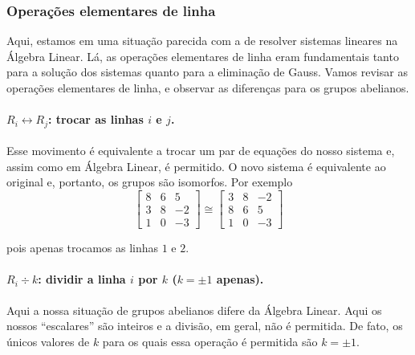     	\subsubsection{Operações elementares de linha}
    	Aqui, estamos em uma situação parecida com a de resolver sistemas lineares na Álgebra Linear. 
    	Lá, as operações elementares de linha eram fundamentais tanto para a solução dos sistemas quanto 
    	para a eliminação de Gauss. Vamos revisar as operações elementares de linha, e observar as 
    	diferenças para os grupos abelianos.
    	
    	\paragraph{$R_i\leftrightarrow R_j$: trocar as linhas $i$ e $j$.} Esse movimento é equivalente a 
    	trocar um par de equações do nosso sistema e, assim como em Álgebra Linear, é permitido. O novo 
    	sistema é equivalente ao original e, portanto, os grupos são isomorfos. Por exemplo
    	$$
    	\begin{bmatrix}
    	8 & 6 & 5 \\
    	3 & 8 & -2 \\
    	1 & 0 & -3
    	\end{bmatrix}\cong\begin{bmatrix}
    	3 & 8 & -2 \\
    	8 & 6 & 5 \\
    	1 & 0 & -3
    	\end{bmatrix}
    	$$
    	\par\vspace{0.3cm} pois apenas trocamos as linhas $1$ e $2$.
    	
    	\paragraph{$R_i \div k$: dividir a linha $i$ por $k$ ($k=\pm1$ apenas).} Aqui a nossa situação 
    	de grupos abelianos difere da Álgebra Linear. Aqui os nossos ``escalares'' são inteiros e a divisão, 
    	em geral, não é permitida. De fato, os únicos valores de $k$ para os quais essa operação é permitida 
    	são $k=\pm1$.
    	

